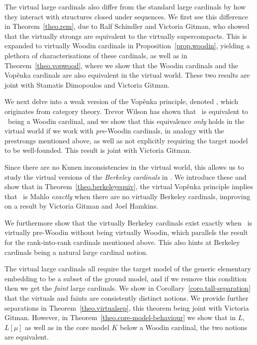 \documentclass[../main]{subfiles}
\begin{document}
\begin{onehalfspacing}
\quad The virtual large cardinals also differ from the standard large cardinals by how they interact with structures closed under sequences. We first see this difference in Theorem~\ref{theo.rem}, due to Ralf Schindler and Victoria Gitman, who showed that the virtually strongs are equivalent to the virtually supercompacts. This is expanded to virtually Woodin cardinals in Proposition~\ref{prop.woodin}, yielding a plethora of characterisations of these cardinals, as well as in Theorem~\ref{theo.vopwood}, where we show that the Woodin cardinals and the Vop\v enka cardinals are also equivalent in the virtual world. These two results are joint with Stamatis Dimopoulos and Victoria Gitman.

\quad We next delve into a weak version of the Vop\v enka principle, denoted \wvp, which originates from category theory. Trevor Wilson has shown that \wvp\ is equivalent to \on\ being a Woodin cardinal, and we show that this equivalence \textit{only} holds in the virtual world if we work with \textit{pre}-Woodin cardinals, in analogy with the prestrongs mentioned above, as well as not explicitly requiring the target model to be well-founded. This result is joint with Victoria Gitman.

\quad Since there are no Kunen inconsistencies in the virtual world, this allows us to study the virtual versions of the \textit{Berkeley cardinals} in \zfc. We introduce these and show that in Theorem~\ref{theo.berkeleyequiv}, the virtual Vop\v enka principle implies that \on\ is Mahlo \textit{exactly} when there are no virtually Berkeley cardinals, improving on a result by Victoria Gitman and Joel Hamkins.

\quad We furthermore show that the virtually Berkeley cardinals exist exactly when \on\ is virtually pre-Woodin without being virtually Woodin, which parallels the result for the rank-into-rank cardinals mentioned above. This also hints at Berkeley cardinals being a natural large cardinal notion.

\quad The virtual large cardinals all require the target model of the generic elementary embedding to be a subset of the ground model, and if we remove this condition then we get the \textit{faint} large cardinals. We show in Corollary~\ref{coro.tall-separation} that the virtuals and faints are consistently distinct notions. We provide further separations in Theorem~\ref{theo.virtualsep}, this theorem being joint with Victoria Gitman. However, in Theorem~\ref{theo.core-model-behaviour} we show that in $L$, $L[\mu]$ as well as in the core model $K$ below a Woodin cardinal, the two notions are equivalent.


\end{onehalfspacing}
\end{document}
